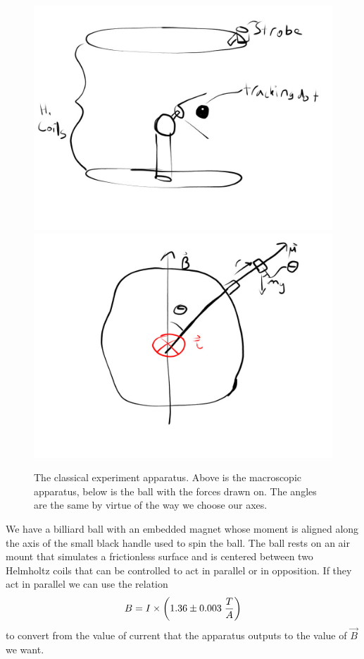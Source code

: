 \documentclass{article}
\newcommand{\B}{$\vec{B}\,$}
\begin{document}
	\begin{figure}[!htb]
		\centering
		\includegraphics[scale=.35]{bigcoils.jpg}
		\includegraphics[scale=.35]{ball.jpg}
		\caption{The classical experiment apparatus.  Above is the macroscopic apparatus, below is the ball with the forces drawn on.  The angles are the same by virtue of the way we choose our axes.}
	\end{figure}

	We have a billiard ball with an embedded magnet whose moment is aligned along the axis of the small black handle used to spin the ball.  The ball rests on an air mount that simulates a frictionless surface and is centered between two Helmholtz coils that can be controlled to act in parallel or in opposition.  If they act in parallel we can use the relation
	\begin{equation*}
		B = I \times \bigg{(}1.36 \pm 0.003 \hspace{.1cm} \frac{T}{A}\bigg{)}
	\end{equation*}
	to convert from the value of current that the apparatus outputs to the value of \B we want.
\end{document}
